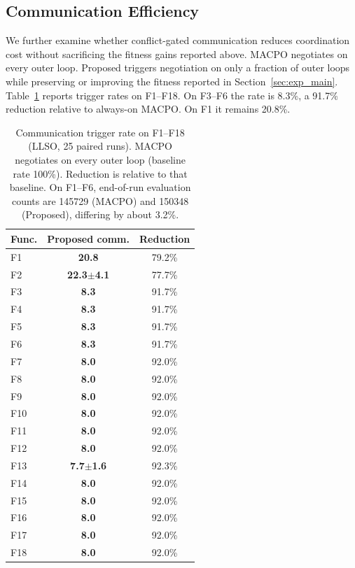 \documentclass[conference]{IEEEtran}
\begin{document}
\subsection{Communication Efficiency}\label{sec:exp_comm}\label{sec:exp_q2}
We further examine whether conflict-gated communication reduces coordination cost without sacrificing the fitness gains reported above. MACPO negotiates on every outer loop. Proposed triggers negotiation on only a fraction of outer loops while preserving or improving the fitness reported in Section~\ref{sec:exp_main}. Table~\ref{tab:comm_rate_f1_f18} reports trigger rates on F1--F18. On F3--F6 the rate is 8.3\%, a 91.7\% reduction relative to always-on MACPO. On F1 it remains 20.8\%.

\begin{table}[!t]
\centering
\scriptsize
\setlength{\tabcolsep}{4pt}
\caption{Communication trigger rate on F1--F18 (LLSO, 25 paired runs). MACPO negotiates on every outer loop (baseline rate 100\%). Reduction is relative to that baseline. On F1--F6, end-of-run evaluation counts are 145729 (MACPO) and 150348 (Proposed), differing by about 3.2\%.}
\label{tab:comm_rate_f1_f18}
\begin{tabular}{@{}lcc@{}}
\toprule
\textbf{Func.} & \textbf{Proposed comm.} & \textbf{Reduction} \\
\midrule
F1 & \textbf{20.8} & 79.2\% \\
F2 & \textbf{22.3{$\pm$4.1}} & 77.7\% \\
F3 & \textbf{8.3} & 91.7\% \\
F4 & \textbf{8.3} & 91.7\% \\
F5 & \textbf{8.3} & 91.7\% \\
F6 & \textbf{8.3} & 91.7\% \\
F7 & \textbf{8.0} & 92.0\% \\
F8 & \textbf{8.0} & 92.0\% \\
F9 & \textbf{8.0} & 92.0\% \\
F10 & \textbf{8.0} & 92.0\% \\
F11 & \textbf{8.0} & 92.0\% \\
F12 & \textbf{8.0} & 92.0\% \\
F13 & \textbf{7.7{$\pm$1.6}} & 92.3\% \\
F14 & \textbf{8.0} & 92.0\% \\
F15 & \textbf{8.0} & 92.0\% \\
F16 & \textbf{8.0} & 92.0\% \\
F17 & \textbf{8.0} & 92.0\% \\
F18 & \textbf{8.0} & 92.0\% \\
\bottomrule
\end{tabular}
\end{table}
\end{document}
